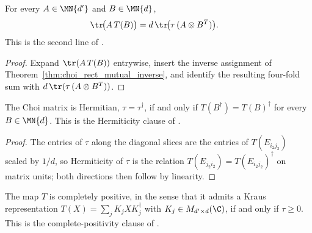 \begin{theorem}
    \label{thm:choi_rect_trace_pairing}
    \leanok
    For every $A\in\MN{d'}$ and $B\in\MN{d}$,
    \begin{align}
        \tr\!\bigl(A\,T(B)\bigr)
          &= d\,\tr\!\bigl(\tau\,(A\otimes B^{T})\bigr).
        \notag
    \end{align}
    This is the second line of \cite[Proposition~2.1, Equation~(2.1)]{Wolf2012Quantum}.
\end{theorem}

\begin{proof}
    \leanok
    Expand $\tr(A\,T(B))$ entrywise, insert the inverse assignment of
    Theorem~\ref{thm:choi_rect_mutual_inverse}, and identify the resulting
    four-fold sum with $d\,\tr(\tau\,(A\otimes B^{T}))$.
\end{proof}

\begin{theorem}
    \label{thm:choi_rect_hermiticity}
    \leanok
    The Choi matrix is Hermitian, $\tau=\tau^\dagger$, if and only if
    $T(B^\dagger)=T(B)^\dagger$ for every $B\in\MN{d}$. This is the
    Hermiticity clause of \cite[Proposition~2.1]{Wolf2012Quantum}.
\end{theorem}

\begin{proof}
    \leanok
    The entries of $\tau$ along the diagonal slices are the entries of
    $T(E_{i_2 j_2})$ scaled by $1/d$, so Hermiticity of $\tau$ is the
    relation $T(E_{j_2 i_2})=T(E_{i_2 j_2})^\dagger$ on matrix units; both
    directions then follow by linearity.
\end{proof}

\begin{theorem}
    \label{thm:choi_rect_cp}
    \leanok
    The map $T$ is completely positive, in the sense that it admits a Kraus
    representation $T(X)=\sum_{j}K_jXK_j^\dagger$ with
    $K_j\in M_{d'\times d}(\C)$, if and only if $\tau\geq0$. This is the
    complete-positivity clause of \cite[Proposition~2.1]{Wolf2012Quantum}.
\end{theorem}

